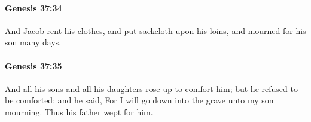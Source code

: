 		\paragraph{Genesis 37:34} %
			\label{GENESIS-37-34}

			And Jacob rent his clothes, and put sackcloth upon his loins, and mourned for his son many days.


		\paragraph{Genesis 37:35} %
			\label{GENESIS-37-35}

			And all his sons and all his daughters rose up to comfort him; but he refused to be comforted; and he said, For I will go down into the grave unto my son mourning. Thus his father wept for him.


